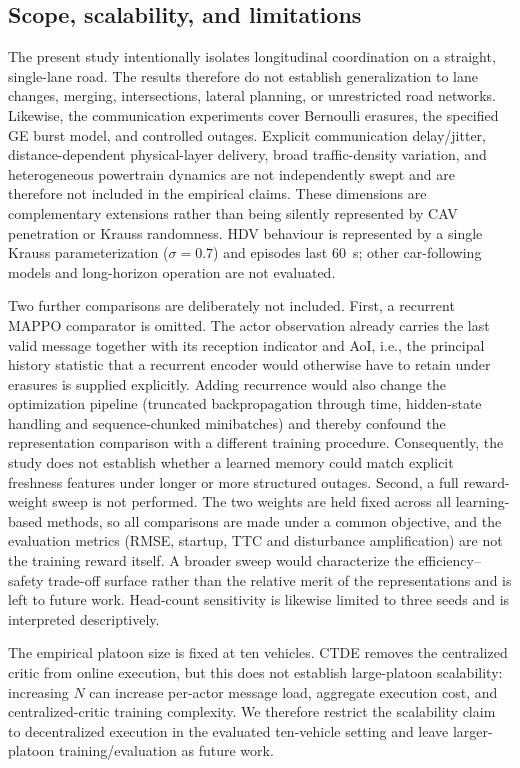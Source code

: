 \documentclass{ieeeaccess}
\begin{document}
\subsection{Scope, scalability, and limitations}
\label{sec:limitations}

The present study intentionally isolates longitudinal coordination on a straight, single-lane road. The results therefore do not establish generalization to lane changes, merging, intersections, lateral planning, or unrestricted road networks. Likewise, the communication experiments cover Bernoulli erasures, the specified GE burst model, and controlled outages. Explicit communication delay/jitter, distance-dependent physical-layer delivery, broad traffic-density variation, and heterogeneous powertrain dynamics are not independently swept and are therefore not included in the empirical claims. These dimensions are complementary extensions rather than being silently represented by CAV penetration or Krauss randomness. HDV behaviour is represented by a single Krauss parameterization ($\sigma=0.7$) and episodes last 60~s; other car-following models and long-horizon operation are not evaluated.

Two further comparisons are deliberately not included. First, a recurrent MAPPO comparator is omitted. The actor observation already carries the last valid message together with its reception indicator and AoI, i.e., the principal history statistic that a recurrent encoder would otherwise have to retain under erasures is supplied explicitly. Adding recurrence would also change the optimization pipeline (truncated backpropagation through time, hidden-state handling and sequence-chunked minibatches) and thereby confound the representation comparison with a different training procedure. Consequently, the study does not establish whether a learned memory could match explicit freshness features under longer or more structured outages. Second, a full reward-weight sweep is not performed. The two weights are held fixed across all learning-based methods, so all comparisons are made under a common objective, and the evaluation metrics (RMSE, startup, TTC and disturbance amplification) are not the training reward itself. A broader sweep would characterize the efficiency--safety trade-off surface rather than the relative merit of the representations and is left to future work. Head-count sensitivity is likewise limited to three seeds and is interpreted descriptively.

The empirical platoon size is fixed at ten vehicles. CTDE removes the centralized critic from online execution, but this does not establish large-platoon scalability: increasing $N$ can increase per-actor message load, aggregate execution cost, and centralized-critic training complexity. We therefore restrict the scalability claim to decentralized execution in the evaluated ten-vehicle setting and leave larger-platoon training/evaluation as future work.
\end{document}
